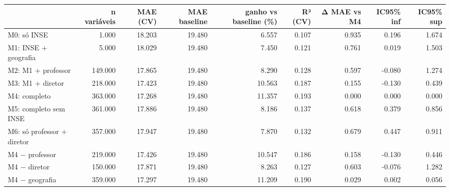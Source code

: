 \begin{tabular}{lrrrrrrrr}
\toprule
 & n variáveis & MAE (CV) & MAE baseline & ganho vs baseline (\%) & R² (CV) & Δ MAE vs M4 & IC95\% inf & IC95\% sup \\
\midrule
M0: só INSE & 1.000 & 18.203 & 19.480 & 6.557 & 0.107 & 0.935 & 0.196 & 1.674 \\
M1: INSE + geografia & 5.000 & 18.029 & 19.480 & 7.450 & 0.121 & 0.761 & 0.019 & 1.503 \\
M2: M1 + professor & 149.000 & 17.865 & 19.480 & 8.290 & 0.128 & 0.597 & -0.080 & 1.274 \\
M3: M1 + diretor & 218.000 & 17.423 & 19.480 & 10.563 & 0.187 & 0.155 & -0.130 & 0.439 \\
M4: completo & 363.000 & 17.268 & 19.480 & 11.357 & 0.193 & 0.000 & 0.000 & 0.000 \\
M5: completo sem INSE & 361.000 & 17.886 & 19.480 & 8.186 & 0.137 & 0.618 & 0.379 & 0.856 \\
M6: só professor + diretor & 357.000 & 17.947 & 19.480 & 7.870 & 0.132 & 0.679 & 0.447 & 0.911 \\
M4 − professor & 219.000 & 17.426 & 19.480 & 10.547 & 0.186 & 0.158 & -0.130 & 0.446 \\
M4 − diretor & 150.000 & 17.871 & 19.480 & 8.263 & 0.127 & 0.603 & -0.076 & 1.282 \\
M4 − geografia & 359.000 & 17.297 & 19.480 & 11.209 & 0.190 & 0.029 & 0.002 & 0.056 \\
\bottomrule
\end{tabular}
